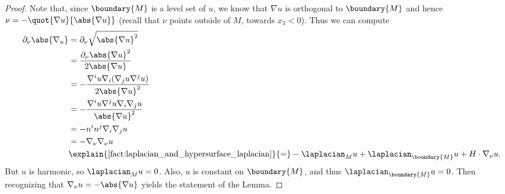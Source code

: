 \documentclass[titlepage,numbers=noenddot,headinclude,oneside,%
footinclude=true,cleardoublepage=empty,%
BCOR=5mm,paper=a4,fontsize=11pt,%
english,%
]{scrartcl}
\let\sphere\relax
\newcommand{\sphere}{\mathbb{S}}
\newcommand{\Mend}{M_{\mathrm{end}}} %
\begin{document}
\begin{proof}
    Note that, since \( \boundary{M} \) is a level set of \( u \), we know that \( \nabla u \) is orthogonal to \( \boundary{M} \) and hence \( \nu=-\quot{\nabla u}{\abs{\nabla u}} \) (recall that \( \nu \) points outside of \( M \), \ie towards \( x_3<0 \)). Thus we can compute
    \begin{equation*}
        \begin{aligned}[t]
            \partial_{\nu}\abs{\nabla_u}&=\partial_{\nu} \sqrt{\abs{\nabla u}^2}\\
            &=\frac{\partial_{\nu} \abs{\nabla u}^2}{2\abs{\nabla u}}\\
            &=-\frac{\nabla^i u \nabla_i(\nabla_j u \nabla^j u)}{2\abs{\nabla u}^2}\\
            &=-\frac{\nabla^i u \nabla^j u \nabla_i \nabla_j u}{\abs{\nabla u}^2}\\
            &=-n^i n^j \nabla_i \nabla_j u\\
            &=-\nabla_{\nu}\nabla_{\nu} u\\
            &\explain{\text{\cref{fact:laplacian_and_hypersurface_laplacian}}}{=}-\laplacian_M u+\laplacian_{\boundary{M}} u +H\cdot \nabla_{\nu} u.
        \end{aligned}
    \end{equation*}
    But \( u \) is harmonic, so \( \laplacian_M u=0 \). Also, \( u \) is constant on \( \boundary{M} \), and thus \( \laplacian_{\boundary{M}}u=0 \). Then recognizing that \( \nabla_{\nu} u=-\abs{\nabla u} \) yields the statement of the Lemma.


\end{proof}
\end{document}
